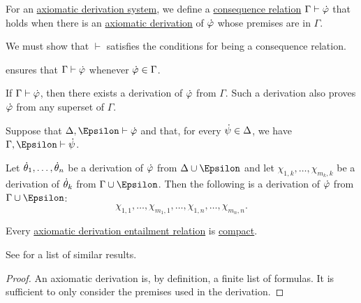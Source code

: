 \begin{definition}\label{def:axiomatic_derivation_entailment}
  For an \hyperref[def:axiomatic_derivation_system]{axiomatic derivation system}, we define a \hyperref[def:consequence_relation]{consequence relation} \( \Gamma \vdash \dot{\varphi} \) that holds when there is an \hyperref[def:axiomatic_derivation]{axiomatic derivation} of \( \dot{\varphi} \) whose premises are in \( \Gamma \).
\end{definition}
\begin{defproof}
  We must show that \( {\vdash} \) satisfies the conditions for being a consequence relation.

    ensures that \( \Gamma \vdash \dot{\varphi} \) whenever \( \dot{\varphi} \in \Gamma \).

   If \( \Gamma \vdash \dot{\varphi} \), then there exists a derivation of \( \dot{\varphi} \) from \( \Gamma \). Such a derivation also proves \( \dot{\varphi} \) from any superset of \( \Gamma \).

   Suppose that \( \Delta, \Epsilon \vdash \syn\varphi \) and that, for every \( \dot{\psi} \in \Delta \), we have \( \Gamma, \Epsilon \vdash \syn\psi \).

  Let \( \dot{\theta}_1, \ldots, \dot{\theta}_n \) be a derivation of \( \dot{\varphi} \) from \( \Delta \cup \Epsilon \) and let \( \chi_{1,k}, \ldots, \chi_{m_k,k} \) be a derivation of \( \dot{\theta}_k \) from \( \Gamma \cup \Epsilon \). Then the following is a derivation of \( \dot{\varphi} \) from \( \Gamma \cup \Epsilon \):
  \begin{equation*}
    \chi_{1,1}, \ldots, \chi_{m_1,1}, \ldots, \chi_{1,n}, \ldots, \chi_{m_n,n}.
  \end{equation*}
\end{defproof}

\begin{proposition}\label{thm:axiomatic_derivation_entailment_compact}
  Every \hyperref[def:axiomatic_derivation_entailment]{axiomatic derivation entailment relation} is \hyperref[def:consequence_relation/compactness]{compact}.
\end{proposition}
\begin{comments}
  \item See  for a list of similar results.
\end{comments}
\begin{proof}
  An axiomatic derivation is, by definition, a finite list of formulas. It is sufficient to only consider the premises used in the derivation.
\end{proof}


